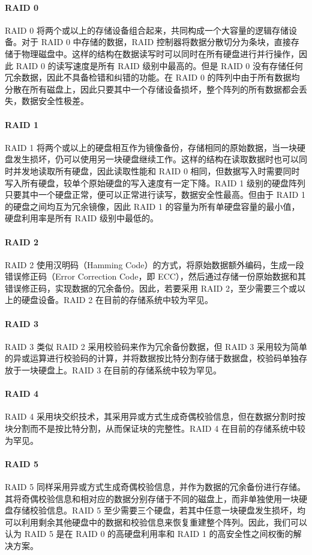 \paragraph{RAID 0}
RAID 0 将两个或以上的存储设备组合起来，共同构成一个大容量的逻辑存储设备。对于 RAID 0 中存储的数据，RAID 控制器将数据分散切分为条块，直接存储于物理磁盘中。这样的结构在数据读写时可以同时在所有硬盘进行并行操作，因此 RAID 0 的读写速度是所有 RAID 级别中最高的。但是 RAID 0 没有存储任何冗余数据，因此不具备检错和纠错的功能。在 RAID 0 的阵列中由于所有数据均分散在所有磁盘上，因此只要其中一个存储设备损坏，整个阵列的所有数据都会丢失，数据安全性极差。
\paragraph{RAID 1}
RAID 1 将两个或以上的硬盘相互作为镜像备份，存储相同的原始数据，当一块硬盘发生损坏，仍可以使用另一块硬盘继续工作。这样的结构在读取数据时也可以同时并发地读取所有硬盘，因此读取性能和 RAID 0 相同，但数据写入时需要同时写入所有硬盘，较单个原始硬盘的写入速度有一定下降。RAID 1 级别的硬盘阵列只要其中一个硬盘正常，便可以正常进行读写，数据安全性最高。但由于 RAID 1 的硬盘之间均互为冗余镜像，因此 RAID 1 的容量为所有单硬盘容量的最小值，硬盘利用率是所有 RAID 级别中最低的。
\paragraph{RAID 2}
RAID 2 使用汉明码（Hamming Code）的方式，将原始数据额外编码，生成一段错误修正码（Error Correction Code，即 ECC），然后通过存储一份原始数据和其错误修正码，实现数据的冗余备份。因此，若要采用 RAID 2，至少需要三个或以上的硬盘设备。RAID 2 在目前的存储系统中较为罕见。
\paragraph{RAID 3}
RAID 3 类似 RAID 2 采用校验码来作为冗余备份数据，但 RAID 3 采用较为简单的异或运算进行校验码的计算，并将数据按比特分割存储于数据盘，校验码单独存放于一块硬盘上。RAID 3 在目前的存储系统中较为罕见。
\paragraph{RAID 4}
RAID 4 采用块交织技术，其采用异或方式生成奇偶校验信息，但在数据分割时按块分割而不是按比特分割，从而保证块的完整性。RAID 4 在目前的存储系统中较为罕见。
\paragraph{RAID 5}
RAID 5 同样采用异或方式生成奇偶校验信息，并作为数据的冗余备份进行存储。其将奇偶校验信息和相对应的数据分别存储于不同的磁盘上，而非单独使用一块硬盘存储校验信息。RAID 5 至少需要三个硬盘，若其中任意一块硬盘发生损坏，均可以利用剩余其他硬盘中的数据和校验信息来恢复重建整个阵列。因此，我们可以认为 RAID 5 是在 RAID 0 的高硬盘利用率和 RAID 1 的高安全性之间权衡的解决方案。
